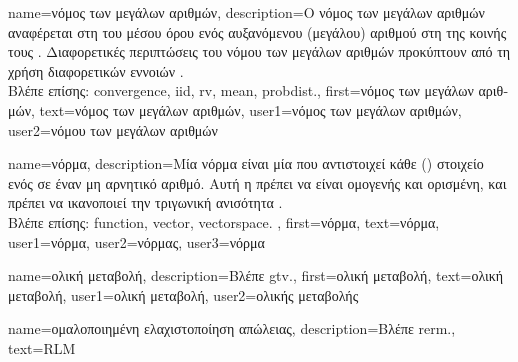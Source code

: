 {name={\foreignlanguage{greek}{νόμος των μεγάλων αριθμών}},
	description={\foreignlanguage{greek}{Ο νόμος των μεγάλων αριθ\-μών} 
		\foreignlanguage{greek}{αναφέρεται στη}  \foreignlanguage{greek}{του μέσου όρου ενός αυξανόμενου 
		(μεγάλου) αριθ\-μού}   \foreignlanguage{greek}{στη}  \foreignlanguage{greek}{της 
		κοινής τους} . \foreignlanguage{greek}{Διαφορετικές περιπτώσεις του νόμου των μεγάλων αριθμών 
		προκύπτουν από τη χρήση διαφορετικών εννοιών}  \cite{papoulis}.\\
		\foreignlanguage{greek}{Βλέπε επίσης:} \gls{convergence}, \gls{iid}, \gls{rv}, \gls{mean}, \gls{probdist}.},
	first={\foreignlanguage{greek}{νόμος των μεγάλων αριθμών}},
	text={\foreignlanguage{greek}{νόμος των μεγάλων αριθμών}},
	user1={\foreignlanguage{greek}{νόμος των μεγάλων αριθμών}}, %
	user2={\foreignlanguage{greek}{νόμου των μεγάλων αριθμών}} %
}

{name={\foreignlanguage{greek}{νόρμα}},
	description={\foreignlanguage{greek}{Μία νόρμα είναι μία}  
		\foreignlanguage{greek}{που αντιστοιχεί κάθε} () \foreignlanguage{greek}{στοιχείο ενός} 
		 \foreignlanguage{greek}{σε έναν μη αρνητικό αριθμό. Αυτή η}  
		\foreignlanguage{greek}{πρέπει να είναι ομογενής και ορισμένη, και πρέπει να ικανοποιεί την τριγωνική 
		ανισότητα} \cite{HornMatAnalysis}.\\
		\foreignlanguage{greek}{Βλέπε επίσης:} \gls{function}, \gls{vector}, \gls{vectorspace}. },
	first={\foreignlanguage{greek}{νόρμα}},
	text={\foreignlanguage{greek}{νόρμα}},
	user1={\foreignlanguage{greek}{νόρμα}}, %
    	user2={\foreignlanguage{greek}{νόρμας}}, %
	user3={\foreignlanguage{greek}{νόρμα}} %
}

{name={\foreignlanguage{greek}{ολική μεταβολή}}, 
	description={\foreignlanguage{greek}{Βλέπε} \gls{gtv}.},
	first={\foreignlanguage{greek}{ολική μεταβολή}},
	text={\foreignlanguage{greek}{ολική μεταβολή}},
	user1={\foreignlanguage{greek}{ολική μεταβολή}}, %
	user2={\foreignlanguage{greek}{ολικής μεταβολής}} %
}

 {name={\foreignlanguage{greek}{ομαλοποιημένη ελαχιστοποίηση απώλειας}},
 	description={\foreignlanguage{greek}{Βλέπε} \gls{rerm}.},
 	text={RLM}
 }

